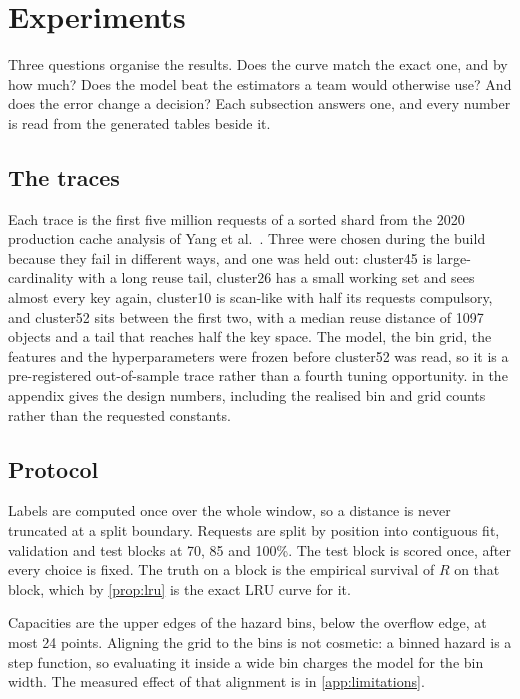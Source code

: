 \section{Experiments}
\label{sec:experiments}

Three questions organise the results. Does the curve match the exact one, and by how
much? Does the model beat the estimators a team would otherwise use? And does the
error change a decision? Each subsection answers one, and every number is read from
the generated tables beside it.

\subsection{The traces}
\label{sec:traces}

Each trace is the first five million requests of a sorted shard from the 2020
production cache analysis of Yang et al.~\cite{yang2020}. Three were chosen during the
build because they fail in different ways, and one was held out: cluster45 is
large-cardinality with a long reuse tail, cluster26 has a small working set and sees
almost every key again, cluster10 is scan-like with half its requests compulsory, and
cluster52 sits between the first two, with a median reuse distance of \num{1097}
objects and a tail that reaches half the key space. The model, the bin grid, the
features and the hyperparameters were frozen before cluster52 was read, so it is a
pre-registered out-of-sample trace rather than a fourth tuning opportunity.
 in the appendix gives the design numbers, including the realised
bin and grid counts rather than the requested constants.

\subsection{Protocol}
\label{sec:protocol}

Labels are computed once over the whole window, so a distance is never truncated at
a split boundary. Requests are split by position into contiguous fit, validation and
test blocks at 70, 85 and 100\%. The test block is scored once, after every choice
is fixed. The truth on a block is the empirical survival of $R$ on that block, which
by \cref{prop:lru} is the exact LRU curve for it.

Capacities are the upper edges of the hazard bins, below the overflow edge, at most
24 points. Aligning the grid to the bins is not cosmetic: a binned hazard is a step
function, so evaluating it inside a wide bin charges the model for the bin width.
The measured effect of that alignment is in \cref{app:limitations}.

